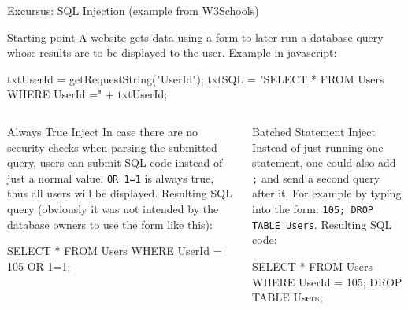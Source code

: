 \begin{frame}[fragile]{Excursus: SQL Injection (example from W3Schools)}

    \begin{block}{Starting point}
    \scriptsize
    A website gets data using a form to later run a database query whose results are to be displayed to the user. Example in javascript:
  \begin{jscode}
txtUserId = getRequestString("UserId");
txtSQL = "SELECT * FROM Users WHERE UserId ="
         + txtUserId;
  \end{jscode}
\end{block}

  \begin{columns}
\begin{block}{Always True Inject}\scriptsize
In case there are no security checks when parsing the submitted query, users can submit SQL code instead of just a normal value. 
\texttt{OR 1=1} is always true, thus all users will be displayed. Resulting SQL query (obviously it was not intended by the database owners to use the form like this):
  \begin{sqlcode}
  SELECT * FROM Users 
  WHERE UserId = 105 OR 1=1;
  \end{sqlcode}
\end{block}
\begin{block}{Batched Statement Inject}\scriptsize
Instead of just running one statement, one could also add \texttt{;} and send a second query after it. For example by typing into the form: \texttt{105; DROP TABLE Users}. Resulting SQL code: 
  \begin{sqlcode}
  SELECT * FROM Users 
  WHERE UserId = 105; 
  DROP TABLE Users;
  \end{sqlcode}
\end{block}
  \end{columns}
\end{frame}





